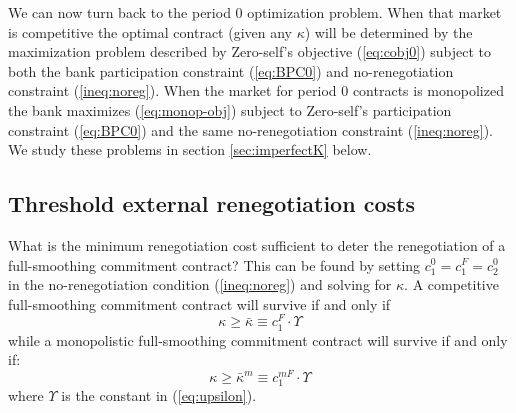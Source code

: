 \documentclass[11pt,english]{article}
\theoremstyle{plain}
\theoremstyle{definition}
\begin{document}
We can now turn back to the period 0 optimization
problem. When that market is competitive the optimal contract (given
any $\kappa$) will be determined by the maximization problem described
by Zero-self's objective (\ref{eq:cobj0}) subject to both the bank
participation constraint (\ref{eq:BPC0}) and no-renegotiation constraint
(\ref{ineq:noreg}). When the market for period 0 contracts is monopolized
the bank maximizes (\ref{eq:monop-obj}) subject to Zero-self's participation
constraint (\ref{eq:BPC0}) and the same no-renegotiation constraint
(\ref{ineq:noreg}). We study these problems in section \ref{sec:imperfectK}
below.

\subsection{Threshold external renegotiation costs }

What is the minimum renegotiation cost sufficient to deter the renegotiation
of a full-smoothing commitment contract? This can be found by setting $c_{1}^{0}=c_{1}^{F}=c_{2}^{0}$
in the no-renegotiation condition (\ref{ineq:noreg}) and solving
for $\kappa$. A competitive full-smoothing commitment contract will
survive if and only if 
\begin{equation}
\kappa\geq\bar{\kappa}\equiv c_{1}^{F}\cdot\Upsilon\label{eq:kbar}
\end{equation}
while a monopolistic full-smoothing commitment contract will survive
if and only if: 
\begin{equation}
\kappa\geq\bar{\kappa}^{m}\equiv c_{1}^{mF}\cdot\Upsilon\label{eq:kbarM}
\end{equation}
where $\Upsilon$ is the constant in (\ref{eq:upsilon}).
\end{document}
